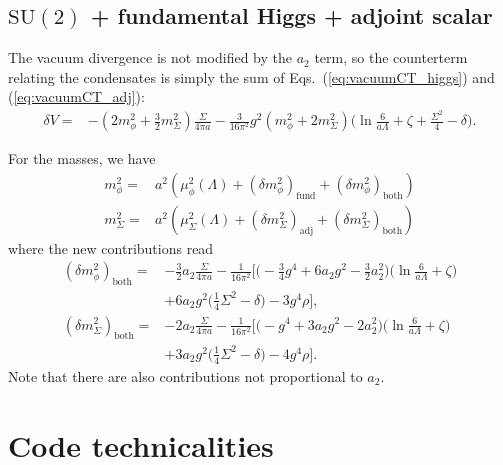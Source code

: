\documentclass[11pt,a4paper]{article}
\newcommand\gr[1]{\mathrm{#1}}%
\begin{document}
\subsection{$\gr{SU(2)}$ + fundamental Higgs + adjoint scalar}

The vacuum divergence is not modified by the $a_2$ term, so the counterterm relating the condensates is simply the sum of Eqs.~(\ref{eq:vacuumCT_higgs}) and (\ref{eq:vacuumCT_adj}):
\begin{align}
\delta V =& - ( 2 m^2_\phi + \frac32 m^2_\Sigma ) \frac{\Sigma}{4\pi a} - \frac{3}{16\pi^2} g^2 ( m^2_\phi + 2 m^2_\Sigma ) \Big( \ln \frac{6}{a \Lambda} +\zeta + \frac{\Sigma^2}{4} - \delta \Big).
\end{align}

For the masses, we have 
\begin{align}
m^2_\phi =& a^2(\mu^2_\phi(\Lambda) + (\delta m^2_\phi)_\text{fund}+ (\delta m^2_\phi)_\text{both} )\\
m^2_\Sigma =& a^2( \mu^2_\Sigma(\Lambda) + (\delta m^2_\Sigma)_\text{adj} + (\delta m^2_\Sigma)_\text{both} ) 
\end{align}
where the new contributions read
\begin{align}
(\delta m^2_\phi)_\text{both} =& -\frac32 a_2 \frac{\Sigma}{4\pi a} - \frac{1}{16\pi^2} \Big[ \Big( -\frac34 g^4 + 6 a_2 g^2 - \frac32 a_2^2  \Big)\Big( \ln \frac{6}{a\Lambda}+\zeta \Big) \nonumber \\ 
& + 6 a_2 g^2 \Big( \frac14 \Sigma^2 - \delta \Big) - 3g^4 \rho \Big], \\
%
(\delta m^2_\Sigma)_\text{both} =& -2 a_2 \frac{\Sigma}{4\pi a} - \frac{1}{16\pi^2}\Big[ \Big( -g^4 + 3 a_2 g^2 - 2 a_2^2 \Big)\Big( \ln\frac{6}{a \Lambda} + \zeta \Big) \nonumber \\
&+ 3 a_2 g^2 \Big( \frac14 \Sigma^2 - \delta \Big) - 4 g^4 \rho \Big].
\end{align}
Note that there are also contributions not proportional to $a_2$.


\section{Code technicalities}
\end{document}

